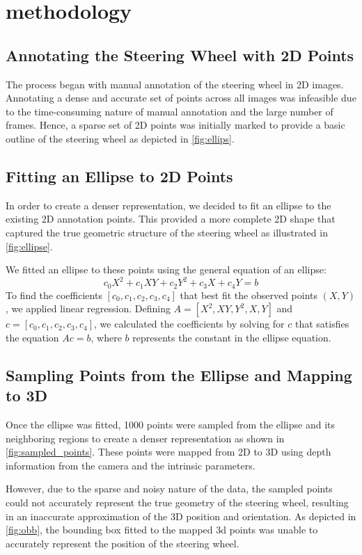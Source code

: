 \section{methodology}

\subsection{Annotating the Steering Wheel with 2D Points}
The process began with manual annotation of the steering wheel 
in 2D images. Annotating a dense and accurate set of points 
across all images was infeasible due to the time-consuming 
nature of manual annotation and the large number of frames. 
Hence, a sparse set of 2D points was initially marked to 
provide a basic outline of the steering wheel as depicted in 
\cref{fig:ellips}.

\subsection{Fitting an Ellipse to 2D Points}
In order to create a denser representation, we decided to fit 
an ellipse to the existing 2D annotation points. This provided 
a more complete 2D shape that captured the true geometric 
structure of the steering wheel as illustrated in \cref{fig:ellipse}. 

We fitted an ellipse to these points using the general equation of an ellipse:
\[
c_0 X^2 + c_1 XY + c_2 Y^2 + c_3 X + c_4 Y = b
\]
To find the coefficients \([c_0, c_1, c_2, c_3, c_4]\) 
that best fit the observed points \((X, Y)\), we applied linear 
regression. Defining \( A = [X^2, XY, Y^2, X, Y] \) and 
\( c = [c_0, c_1, c_2, c_3, c_4] \), we calculated the coefficients 
by solving for \( c \) that satisfies the equation \( Ac = b \), 
where \( b \) represents the constant in the ellipse equation. 


\subsection{Sampling Points from the Ellipse and Mapping to 3D}
Once the ellipse was fitted, 1000 points were sampled from 
the ellipse and its neighboring regions to create a denser 
representation as shown in \cref{fig:sampled_points}. These points were mapped from 2D to 3D using 
depth information from the camera and the intrinsic parameters.

However, due to the sparse and noisy nature of the data, 
the sampled points could not accurately represent the true 
geometry of the steering wheel, resulting in an inaccurate 
approximation of the 3D position and orientation. 
As depicted in \cref{fig:obb}, the bounding box fitted to the 
mapped 3d points was unable to accurately represent the 
position of the steering wheel.

